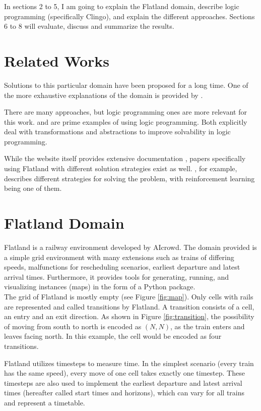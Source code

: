 \documentclass{llncs}
\begin{document}
\begin{multicols*}{2}
In sections 2 to 5, I am going to explain the Flatland domain, describe logic programming (specifically Clingo), and explain the different approaches. Sections 6 to 8 will evaluate, discuss and summarize the results.

\section*{Related Works}
Solutions to this particular domain have been proposed for a long time. One of the more exhaustive explanations of the domain is provided by \cite[Daduna and Pinto Paix{\~a}o 1995]{Daduna1995}. 

There are many approaches, but logic programming ones are more relevant for this work. \cite[Abels et al. 2020]{Abels20} and \cite[Behrens et al. 2023]{Behrens2023} are prime examples of using logic programming. Both explicitly deal with transformations and abstractions to improve solvability in logic programming.

While the website itself provides extensive documentation \cite{Flat24}, papers specifically using Flatland with different solution strategies exist as well. \cite[Mohanty et al. 2020]{Mohanty20}, for example, describes different strategies for solving the problem, with reinforcement learning being one of them.

\section*{Flatland Domain}
Flatland \cite{Flat24} is a railway environment developed by AIcrowd. The domain provided is a simple grid environment with many extensions such as trains of differing speeds, malfunctions for rescheduling scenarios, earliest departure and latest arrival times. Furthermore, it provides tools for generating, running, and visualizing instances (maps) in the form of a Python package.\\

The grid of Flatland is mostly empty (see Figure \ref{fig:map}). Only cells with rails are represented and called transitions by Flatland. A transition consists of a cell, an entry and an exit direction. As shown in Figure \ref{fig:transition}, the possibility of moving from south to north is encoded as $(N,N)$, as the train enters and leaves facing north. In this example, the cell would be encoded as four transitions.

Flatland utilizes timesteps to measure time. In the simplest scenario (every train has the same speed), every move of one cell takes exactly one timestep. These timesteps are also used to implement the earliest departure and latest arrival times (hereafter called start times and horizons), which can vary for all trains and represent a timetable.


\end{multicols*}
\end{document}
